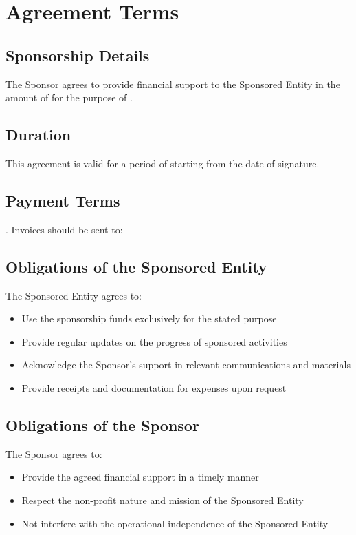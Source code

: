 \documentclass[11pt,a4paper]{article}
\begin{document}
\section{Agreement Terms}

\subsection{Sponsorship Details}
The Sponsor agrees to provide financial support to the Sponsored Entity in the amount of \textbf{\sponsorshipAmount{} \sponsorshipCurrency} for the purpose of \sponsorshipPurpose.

\subsection{Duration}
This agreement is valid for a period of \agreementDuration{} starting from the date of signature.

\subsection{Payment Terms}
\paymentTerms. Invoices should be sent to:

\invoiceAddress

\subsection{Obligations of the Sponsored Entity}
The Sponsored Entity agrees to:
\begin{itemize}
    \item Use the sponsorship funds exclusively for the stated purpose
    \item Provide regular updates on the progress of sponsored activities
    \item Acknowledge the Sponsor's support in relevant communications and materials
    \item Provide receipts and documentation for expenses upon request
\end{itemize}

\subsection{Obligations of the Sponsor}
The Sponsor agrees to:
\begin{itemize}
    \item Provide the agreed financial support in a timely manner
    \item Respect the non-profit nature and mission of the Sponsored Entity
    \item Not interfere with the operational independence of the Sponsored Entity
\end{itemize}
\end{document}
